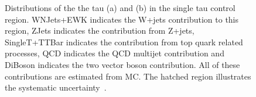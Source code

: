 \begin{figure}
  \caption{Distributions of the the tau \pt (a) and \dphijj (b) in the single tau control region. WNJets+EWK indicates the W+jets contribution to this region, ZJets indicates the contribution from Z+jets, SingleT+TTBar indicates the contribution from top quark related processes, \ac{QCD} indicates the \ac{QCD} multijet contribution and DiBoson indicates the two vector boson contribution. All of these contributions are estimated from \ac{MC}. The hatched region illustrates the systematic uncertainty~\cite{ARTICLE:CMSAN-12-403}.}
  \label{fig:promptwtaunu}
\end{figure}

